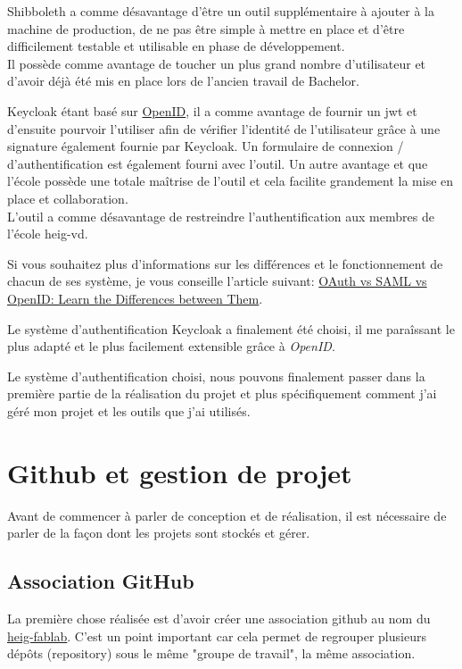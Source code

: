 \documentclass[
    iai, %
    il, %
]{heig-tb}
\begin{document}
Shibboleth a comme désavantage d'être un outil supplémentaire à ajouter à la machine de production, de ne pas être simple à mettre en place et d'être difficilement testable et utilisable en phase de développement. \\
Il possède comme avantage de toucher un plus grand nombre d'utilisateur et d'avoir déjà été mis en place lors de l'ancien travail de Bachelor.

Keycloak étant basé sur \href{https://openid.net/connect/}{OpenID}, il a comme avantage de fournir un \Gls{jwt} et d'ensuite pourvoir l'utiliser afin de vérifier l'identité de l'utilisateur grâce à une signature également fournie par Keycloak. Un formulaire de connexion / d'authentification est également fourni avec l'outil. Un autre avantage et que l'école possède une totale maîtrise de l'outil et cela facilite grandement la mise en place et collaboration. \\
L'outil a comme désavantage de restreindre l'authentification aux membres de l'école \Gls{heig-vd}.

Si vous souhaitez plus d'informations sur les différences et le fonctionnement de chacun de ses système, je vous conseille l'article suivant: \href{https://www.parallels.com/blogs/ras/oauth-vs-saml-vs-openid/#:~:text=While%20the%20use%20cases%20for,than%20SAML%20and%20OpenID%20Connect}{OAuth vs SAML vs OpenID: Learn the Differences between Them}.


Le système d'authentification Keycloak a finalement été choisi, il me paraîssant le plus adapté et le plus facilement extensible grâce à \emph{OpenID}.

Le système d'authentification choisi, nous pouvons finalement passer dans la première partie de la réalisation du projet et plus spécifiquement comment j'ai géré mon projet et les outils que j'ai utilisés.

\chapter{Github et gestion de projet}
Avant de commencer à parler de conception et de réalisation, il est nécessaire de parler de la façon dont les projets sont stockés et gérer.

\section{Association GitHub}
La première chose réalisée est d'avoir créer une association \Gls{github} au nom du \href{https://github.com/heig-fablab}{heig-fablab}. C'est un point important car cela permet de regrouper plusieurs dépôts (\Gls{repository}) sous le même "groupe de travail", la même association.
\end{document}
